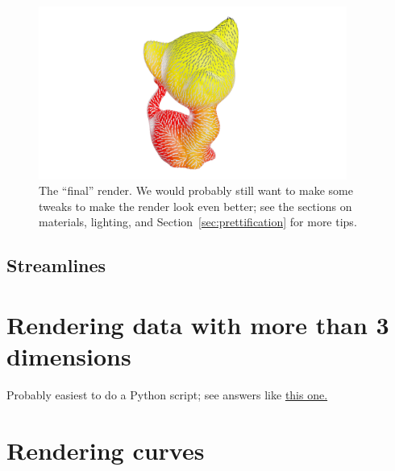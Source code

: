 \documentclass[10pt]{article}
\begin{document}
\begin{enumerate}
\begin{figure}[H]
        \centering
        \captionsetup{width=0.8\textwidth}
        \includegraphics[width=0.9\textwidth]{images/vector_field_final_render.png}
        \caption{The ``final'' render. We would probably still want to make some tweaks to make the render look even better; see the sections on materials, lighting, and Section~\ref{sec:prettification} for more tips.}
    \end{figure}
\end{enumerate}

\subsection{Streamlines}

\section{Rendering data with more than 3 dimensions}
Probably easiest to do a Python script; see answers like \href{https://blender.stackexchange.com/a/118494}{this one.}

\section{Rendering curves}
\end{document}
